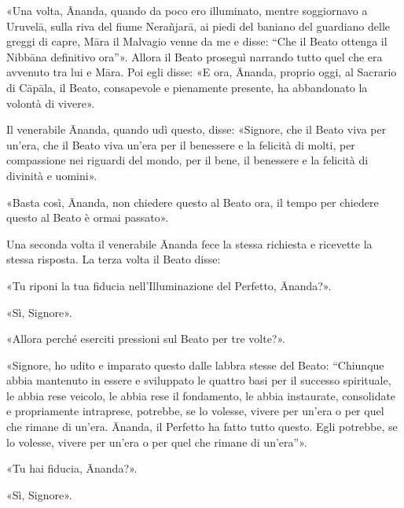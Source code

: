

«Una volta, Ānanda, quando da poco ero illuminato, mentre soggiornavo a
Uruvelā, sulla riva del fiume Nerañjarā, ai piedi del baniano del
guardiano delle greggi di capre, Māra il Malvagio venne da me e disse:
“Che il Beato ottenga il Nibbāna definitivo ora”». Allora il Beato
proseguì narrando tutto quel che era avvenuto tra lui e Māra. Poi egli
disse: «E ora, Ānanda, proprio oggi, al Sacrario di Cāpāla, il Beato,
consapevole e pienamente presente, ha abbandonato la volontà di vivere».


Il venerabile Ānanda, quando udì questo, disse: «Signore, che il Beato
viva per un’era, che il Beato viva un’era per il benessere e la felicità
di molti, per compassione nei riguardi del mondo, per il bene, il
benessere e la felicità di divinità e uomini».


«Basta così, Ānanda, non chiedere questo al Beato ora, il tempo per
chiedere questo al Beato è ormai passato».


Una seconda volta il venerabile Ānanda fece la stessa richiesta e
ricevette la stessa risposta. La terza volta il Beato disse:


«Tu riponi la tua fiducia nell’Illuminazione del Perfetto, Ānanda?».


«Sì, Signore».


«Allora perché eserciti pressioni sul Beato per tre volte?».


«Signore, ho udito e imparato questo dalle labbra stesse del Beato:
“Chiunque abbia mantenuto in essere e sviluppato le quattro basi per il
successo spirituale, le abbia rese veicolo, le abbia rese il fondamento,
le abbia instaurate, consolidate e propriamente intraprese, potrebbe, se
lo volesse, vivere per un’era o per quel che rimane di un’era. Ānanda,
il Perfetto ha fatto tutto questo. Egli potrebbe, se lo volesse, vivere
per un’era o per quel che rimane di un’era”».


«Tu hai fiducia, Ānanda?».


«Sì, Signore».


